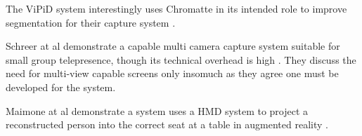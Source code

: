 The ViPiD system interestingly uses Chromatte in its intended role to improve segmentation for their capture system \cite{Klie2006}. \par
Schreer at al demonstrate a capable multi camera capture system suitable for small group telepresence, though its technical overhead is high \cite{Schreer:2008ty}. They discuss the need for multi-view capable screens only insomuch as they agree one must be developed for the system.\par
Maimone at al demonstrate a system uses a HMD system to project a reconstructed person into the correct seat at a table in augmented reality \cite{Maimone2013}.\par
                        

            


